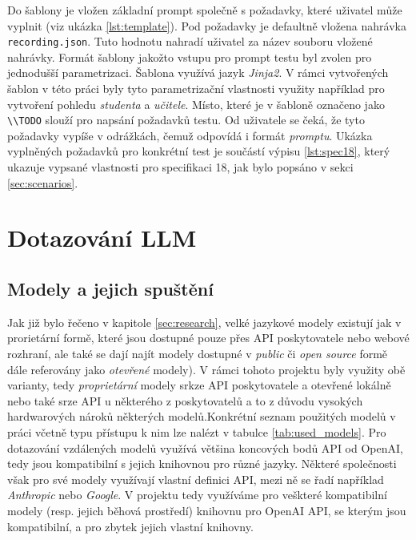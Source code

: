 \documentclass[czech, ma, kiv, he, iso690numb, pdf, viewonly]{fasthesis}
\begin{document}
            Do šablony je vložen základní prompt společně s požadavky, které uživatel může vyplnit (viz ukázka \ref{lst:template}). Pod požadavky je defaultně vložena nahrávka \verb|recording.json|. Tuto hodnotu nahradí uživatel za název souboru vložené nahrávky. Formát šablony jakožto vstupu pro prompt testu byl zvolen pro jednodušší parametrizaci. Šablona využívá jazyk \emph{Jinja2}. V rámci vytvořených šablon v této práci byly tyto parametrizační vlastnosti využity například pro vytvoření pohledu \textit{studenta} a \textit{učitele}. Místo, které je v šabloně označeno jako \verb|\\TODO| slouží pro napsání požadavků testu. Od uživatele se čeká, že tyto požadavky vypíše v odrážkách, čemuž odpovídá i formát \emph{promptu}. Ukázka vyplněných požadavků pro konkrétní test je součástí výpisu \ref{lst:spec18}, který ukazuje vypsané vlastnosti pro specifikaci 18, jak bylo popsáno v sekci \ref{sec:scenarios}.


    \section{Dotazování LLM}

        \subsection{Modely a jejich spuštění}
            
            Jak již bylo řečeno v kapitole \ref{sec:research}, velké jazykové modely existují jak v prorietární formě, které jsou dostupné pouze přes API poskytovatele nebo webové rozhraní, ale také se dají najít modely dostupné v \textit{public} či \textit{open source} formě dále referovány jako \emph{otevřené} modely). V rámci tohoto projektu byly využity obě varianty, tedy \emph{proprietární} modely srkze API poskytovatele a otevřené lokálně nebo také srze API u některého z poskytovatelů a to z důvodu vysokých hardwarových nároků některých modelů.Konkrétní seznam použitých modelů v práci včetně typu přístupu k nim lze nalézt v tabulce \ref{tab:used_models}. Pro dotazování vzdálených modelů využívá většina koncových bodů API od OpenAI, tedy jsou kompatibilní s jejich knihovnou pro různé jazyky. Některé společnosti však pro své modely využívají vlastní definici API, mezi ně se řadí například \textit{Anthropic} nebo \textit{Google}. V projektu tedy využíváme pro veškteré kompatibilní modely (resp. jejich běhová prostředí) knihovnu pro OpenAI API, se kterým jsou kompatibilní, a pro zbytek jejich vlastní knihovny.
\end{document}
